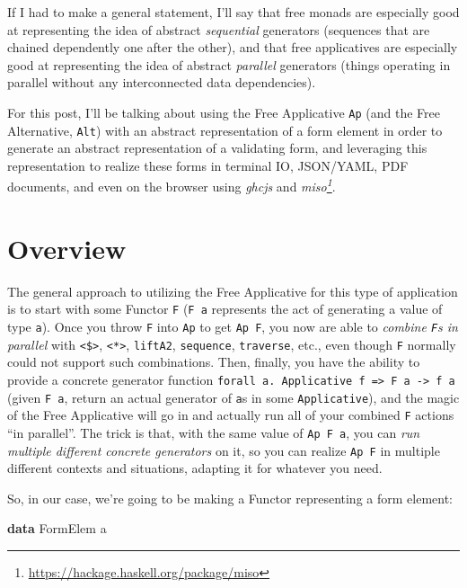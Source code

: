 \documentclass[]{article}
\newenvironment{Shaded}{}{}
\newcommand{\DataTypeTok}[1]{\textcolor[rgb]{0.56,0.13,0.00}{#1}}
\newcommand{\KeywordTok}[1]{\textcolor[rgb]{0.00,0.44,0.13}{\textbf{#1}}}
\newcommand{\NormalTok}[1]{#1}
\renewcommand{\href}[2]{#2\footnote{\url{#1}}}
\begin{document}
If I had to make a general statement, I'll say that free monads are especially
good at representing the idea of abstract \emph{sequential} generators
(sequences that are chained dependently one after the other), and that free
applicatives are especially good at representing the idea of abstract
\emph{parallel} generators (things operating in parallel without any
interconnected data dependencies).

For this post, I'll be talking about using the Free Applicative \texttt{Ap} (and
the Free Alternative, \texttt{Alt}) with an abstract representation of a form
element in order to generate an abstract representation of a validating form,
and leveraging this representation to realize these forms in terminal IO,
JSON/YAML, PDF documents, and even on the browser using \emph{ghcjs} and
\emph{\href{https://hackage.haskell.org/package/miso}{miso}}.

\section{Overview}\label{overview}

The general approach to utilizing the Free Applicative for this type of
application is to start with some Functor \texttt{F} (\texttt{F\ a} represents
the act of generating a value of type \texttt{a}). Once you throw \texttt{F}
into \texttt{Ap} to get \texttt{Ap\ F}, you now are able to \emph{combine
\texttt{F}s in parallel} with \texttt{\textless{}\$\textgreater{}},
\texttt{\textless{}*\textgreater{}}, \texttt{liftA2}, \texttt{sequence},
\texttt{traverse}, etc., even though \texttt{F} normally could not support such
combinations. Then, finally, you have the ability to provide a concrete
generator function
\texttt{forall\ a.\ Applicative\ f\ =\textgreater{}\ F\ a\ -\textgreater{}\ f\ a}
(given \texttt{F\ a}, return an actual generator of \texttt{a}s in some
\texttt{Applicative}), and the magic of the Free Applicative will go in and
actually run all of your combined \texttt{F} actions ``in parallel''. The trick
is that, with the same value of \texttt{Ap\ F\ a}, you can \emph{run multiple
different concrete generators} on it, so you can realize \texttt{Ap\ F} in
multiple different contexts and situations, adapting it for whatever you need.

So, in our case, we're going to be making a Functor representing a form element:

\begin{Shaded}
\begin{Highlighting}[]
\KeywordTok{data} \DataTypeTok{FormElem}\NormalTok{ a}
\end{Highlighting}
\end{Shaded}
\end{document}
